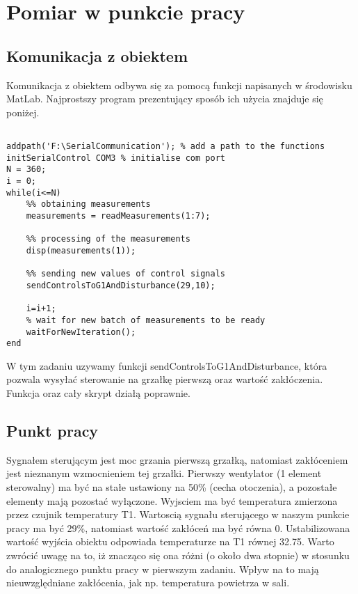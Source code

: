 \chapter{Pomiar w punkcie pracy}
\section{Komunikacja z obiektem}
Komunikacja z obiektem odbywa się za pomocą funkcji napisanych w środowisku MatLab. Najprostszy program prezentujący sposób ich użycia znajduje się poniżej.
\begin{lstlisting}[style=custommatlab]

addpath('F:\SerialCommunication'); % add a path to the functions
initSerialControl COM3 % initialise com port
N = 360;
i = 0;
while(i<=N)
	%% obtaining measurements
	measurements = readMeasurements(1:7); 
	
	%% processing of the measurements
	disp(measurements(1));
	
	%% sending new values of control signals
	sendControlsToG1AndDisturbance(29,10);
	
	i=i+1;
	% wait for new batch of measurements to be ready
	waitForNewIteration();
end
\end{lstlisting} 
W tym zadaniu uzywamy funkcji sendControlsToG1AndDisturbance, która pozwala wysyłać sterowanie na grzałkę pierwszą oraz wartość zakłóczenia. Funkcja oraz cały skrypt działą poprawnie.
\section{Punkt pracy}
Sygnałem sterującym jest moc grzania pierwszą grzałką, natomiast zakłóceniem jest nieznanym wzmocnieniem tej grzałki. Pierwszy wentylator (1 element sterowalny) ma być na stałe ustawiony na 50\% (cecha otoczenia), a pozostałe elementy mają pozostać wyłączone. Wyjsciem ma być temperatura zmierzona przez czujnik temperatury T1.
Wartoscią sygnału sterującego w naszym punkcie pracy ma być 29\%, natomiast wartość zakłóceń ma być równa 0.
Ustabilizowana wartość wyjścia obiektu  odpowiada temperaturze na T1 równej \num{32.75}. Warto zwrócić uwagę na to, iż znacząco się ona różni (o około dwa stopnie) w stosunku do analogicznego punktu pracy w pierwszym zadaniu. Wpływ na to mają nieuwzględniane zakłócenia, jak np. temperatura powietrza w sali.